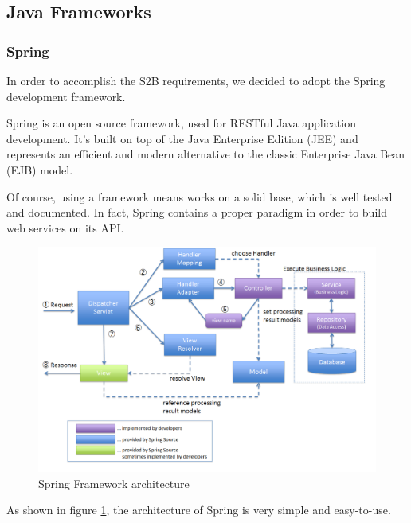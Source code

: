 \documentclass[table, 12pt]{article}
\begin{document}
\subsection{Java Frameworks}
\subsubsection{Spring}
\label{spring}
In order to accomplish the S2B requirements, we decided to adopt the Spring development framework.

Spring is an open source framework, used for RESTful Java application development. It's built on top of the Java Enterprise Edition (JEE) and represents an efficient and modern alternative to the classic Enterprise Java Bean (EJB) model.

Of course, using a framework means works on a solid base, which is well tested and documented. In fact, Spring contains a proper paradigm in order to build web services on its API.

\begin{figure}
    \includegraphics[width=\textwidth]{assets/SpringArchitecture.png}
    \caption{Spring Framework architecture}
    \label{spring_architecture}
\end{figure}

As shown in figure \ref{spring_architecture}, the architecture of Spring is very simple and easy-to-use.
\end{document}
